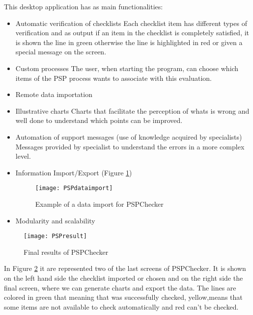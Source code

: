 This desktop application has as main functionalities:
\begin{itemize}
	\item Automatic verification of checklists
	\subitem Each checklist item has different types of verification and as output if an item in the checklist is completely satisfied, it is shown the line in green otherwise the line is highlighted in red or given a special message on the screen.
	\item Custom processes
	\subitem The user, when starting the program, can choose which items of the PSP process wants to associate with this evaluation.
	\item Remote data importation
	\item Illustrative charts
	\subitem Charts that facilitate the perception of whats is wrong and well done to understand which points can be improved.
	\item Automation of support messages (use of knowledge acquired by specialists)
	\subitem Messages provided by specialist to understand the errors in a more complex level.
	\item Information Import/Export (Figure \ref{fig:PSPdataimport})
	\begin{figure}[h]
		\begin{center}
			\leavevmode
			\texttt{[image: PSPdataimport]}
			\caption{Example of a data import for PSPChecker}
			\label{fig:PSPdataimport}
		\end{center}
	\end{figure}
	\item Modularity and scalability
\end{itemize}

\begin{figure}[h]
	\begin{center}
		\leavevmode
		\texttt{[image: PSPresult]}
		\caption{Final results of PSPChecker}
		\label{fig:PSPresults}
	\end{center}
\end{figure}

In Figure \ref{fig:PSPresults} it are represented two of the last screens of PSPChecker. It is shown on the left hand side the checklist imported or chosen and on the right side the final screen, where we can generate charts and export the data. The lines are colored in green that meaning that was successfully checked, yellow,means that some items are not available to check automatically and red can't be checked. 

